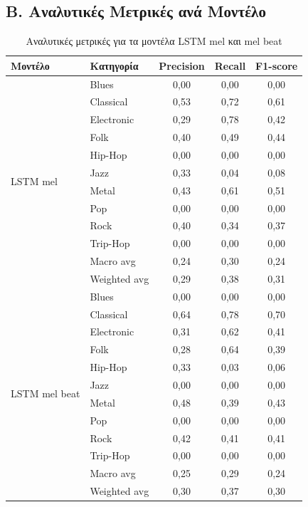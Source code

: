 \documentclass[a4paper,12pt]{article}
\begin{document}
\subsection*{Β. Αναλυτικές Μετρικές ανά Μοντέλο}

\begin{table}[H]
    \centering
    \tiny
    \begin{tabular}{@{}llccc@{}}
        \toprule
        \textbf{Μοντέλο} & \textbf{Κατηγορία} & \textbf{Precision} & \textbf{Recall} & \textbf{F1-score} \\
        \midrule
        \multirow{12}{*}{LSTM mel} 
        & Blues & 0,00 & 0,00 & 0,00 \\
        & Classical & 0,53 & 0,72 & 0,61 \\
        & Electronic & 0,29 & 0,78 & 0,42 \\
        & Folk & 0,40 & 0,49 & 0,44 \\
        & Hip-Hop & 0,00 & 0,00 & 0,00 \\
        & Jazz & 0,33 & 0,04 & 0,08 \\
        & Metal & 0,43 & 0,61 & 0,51 \\
        & Pop & 0,00 & 0,00 & 0,00 \\
        & Rock & 0,40 & 0,34 & 0,37 \\
        & Trip-Hop & 0,00 & 0,00 & 0,00 \\
        \cmidrule{2-5}
        & Macro avg & 0,24 & 0,30 & 0,24 \\
        & Weighted avg & 0,29 & 0,38 & 0,31 \\
        \midrule
        \multirow{12}{*}{LSTM mel beat} 
        & Blues & 0,00 & 0,00 & 0,00 \\
        & Classical & 0,64 & 0,78 & 0,70 \\
        & Electronic & 0,31 & 0,62 & 0,41 \\
        & Folk & 0,28 & 0,64 & 0,39 \\
        & Hip-Hop & 0,33 & 0,03 & 0,06 \\
        & Jazz & 0,00 & 0,00 & 0,00 \\
        & Metal & 0,48 & 0,39 & 0,43 \\
        & Pop & 0,00 & 0,00 & 0,00 \\
        & Rock & 0,42 & 0,41 & 0,41 \\
        & Trip-Hop & 0,00 & 0,00 & 0,00 \\
        \cmidrule{2-5}
        & Macro avg & 0,25 & 0,29 & 0,24 \\
        & Weighted avg & 0,30 & 0,37 & 0,30 \\
        \bottomrule
    \end{tabular}
    \caption{Αναλυτικές μετρικές για τα μοντέλα LSTM mel και mel beat}
\end{table}
\end{document}
